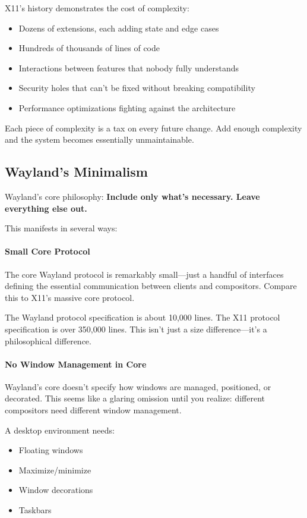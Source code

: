 X11's history demonstrates the cost of complexity:

\begin{itemize}
    \item Dozens of extensions, each adding state and edge cases
    \item Hundreds of thousands of lines of code
    \item Interactions between features that nobody fully understands
    \item Security holes that can't be fixed without breaking compatibility
    \item Performance optimizations fighting against the architecture
\end{itemize}

Each piece of complexity is a tax on every future change. Add enough complexity and the system becomes essentially unmaintainable.

\subsection{Wayland's Minimalism}

Wayland's core philosophy: \textbf{Include only what's necessary. Leave everything else out.}

This manifests in several ways:

\paragraph{Small Core Protocol}
The core Wayland protocol is remarkably small—just a handful of interfaces defining the essential communication between clients and compositors. Compare this to X11's massive core protocol.

\begin{notebox}
The Wayland protocol specification is about 10,000 lines. The X11 protocol specification is over 350,000 lines. This isn't just a size difference—it's a philosophical difference.
\end{notebox}

\paragraph{No Window Management in Core}
Wayland's core doesn't specify how windows are managed, positioned, or decorated. This seems like a glaring omission until you realize: different compositors need different window management.

A desktop environment needs:
\begin{itemize}
    \item Floating windows
    \item Maximize/minimize
    \item Window decorations
    \item Taskbars
\end{itemize}


